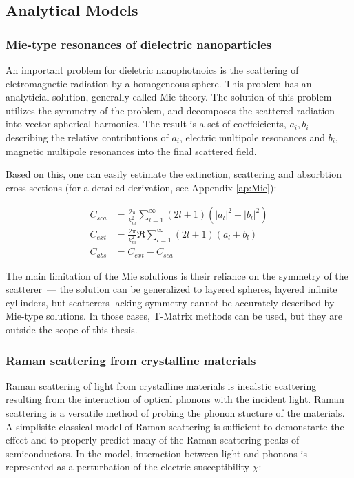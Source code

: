     \subsection{Analytical Models}
        \subsubsection{Mie-type resonances of dielectric nanoparticles}
                An important problem for dieletric nanophotnoics is the scattering of eletromagnetic radiation by
            a homogeneous sphere. This problem has an analyticial solution, generally called Mie theory\cite{mie1908beitrage}.
            The solution of this problem utilizes the symmetry of the problem, and decomposes the scattered radiation into
            vector spherical harmonics. The result is a set of coeffeicients, $a_i, b_i$ describing the relative contributions
            of $a_i$, electric multipole resonances and $b_i$, magnetic multipole resonances into the final scattered field.

                Based on this, one can easily estimate the extinction, scattering and absorbtion cross-sections (for a detailed
                derivation, see Appendix \ref{ap:Mie}):

            \begin{align}
                C_{sca} &= \frac{2\pi}{k^2_m}\sum_{l=1}^\infty (2l +1)(|a_l|^2 + |b_l|^2)\\
                C_{ext} &= \frac{2\pi}{k^2_m}\Re\sum_{l=1}^\infty (2l +1)(a_l + b_l)\\
                C_{abs} &= C_{ext} - C_{sca}
            \end{align}

                The main limitation of the Mie solutions is their reliance on the symmetry of the scatterer~--- the solution can
            be generalized to layered spheres, layered  infinite cyllinders, but scatterers lacking symmetry cannot be accurately described
            by Mie-type solutions. In those cases, T-Matrix methods can be used, but they are outside the scope of this thesis.

        \subsubsection{Raman scattering from crystalline materials}
                Raman scattering of light from crystalline materials is inealstic scattering resulting from the interaction of optical phonons with
            the incident light. Raman scattering is a versatile method of probing the phonon stucture of the materials.
            A simplisitc classical model of Raman scattering is sufficient to demonstarte the effect and to properly predict many of the
            Raman scattering peaks of semiconductors\cite{peter2010fundamentals}. In the model, interaction between light and phonons
            is represented as a perturbation of the electric susceptibility $\chi$:

